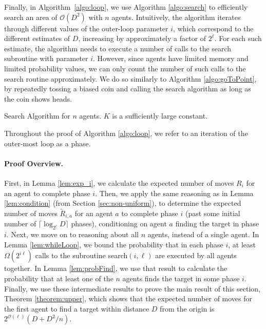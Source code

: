 \documentclass[11pt]{article}
\newcommand{\BO}{\mathcal{O}}
\begin{document}
Finally, in Algorithm~\ref{algo:loop}, we use Algorithm \ref{algo:search} to efficiently search an area of $\BO(D^2)$ with $n$ agents. Intuitively, the algorithm iterates through different values of the outer-loop parameter $i$, which correspond to the different estimates of $D$, increasing by approximately a factor of $2^{\ell}$. For each such estimate, the algorithm needs to execute a number of calls to the search subroutine with parameter $i$. 
However, since agents have limited memory and limited probability values, we can only count the number of such calls to the search routine approximately. We do so similarly to Algorithm \ref{algo:goToPoint}, by repeatedly tossing a biased coin and calling the search algorithm as long as the coin shows heads. 

\begin{algorithm}
\caption{Search Algorithm for $n$ agents. $K$ is a sufficiently large constant.}
\label{algo:loop}
\end{algorithm}

Throughout the proof of Algorithm \ref{algo:loop}, we refer to an iteration of the outer-most loop as a phase. 

\paragraph{Proof Overview.} First, in Lemma \ref{lem:exp_i}, we calculate the expected number of moves $R_i$ for an agent to complete phase $i$. Then, we apply the same reasoning as in Lemma \ref{lem:condition} (from Section \ref{sec:non-uniform}), to determine the expected number of  moves $\tilde{R}_{i,a}$ for an agent $a$ to complete phase $i$ (past some initial number of $\lceil \log_{2^{\ell}} D \rceil$ phases), conditioning on agent $a$ finding the target in phase $i$. Next, we move on to reasoning about all $n$ agents, instead of a single agent. In Lemma \ref{lem:whileLoop}, we bound the probability that in each phase $i$, at least $\Omega(2^{i\ell})$ calls to the subroutine search$(i,\ell)$ are executed by all agents together. In Lemma \ref{lem:probFind}, we use that result to calculate the probability that at least one of the $n$ agents finds the target in some phase $i$. Finally, we use these intermediate results to prove the main result of this section, Theorem \ref{theorem:upper}, which shows that the expected number of moves for the first agent to find a target within distance $D$ from the origin is $2^{\BO(\ell)}(D+D^2/n)$.
\end{document}
